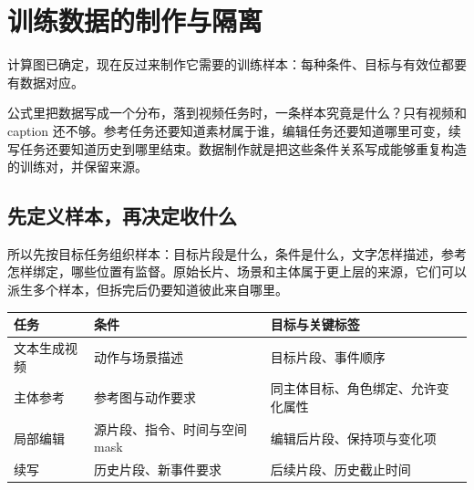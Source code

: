 \chapter{训练数据的制作与隔离}\label{seedance-m11}

计算图已确定，现在反过来制作它需要的训练样本：每种条件、目标与有效位都要有数据对应。

公式里把数据写成一个分布，落到视频任务时，一条样本究竟是什么？只有视频和 caption 还不够。参考任务还要知道素材属于谁，编辑任务还要知道哪里可变，续写任务还要知道历史到哪里结束。数据制作就是把这些条件关系写成能够重复构造的训练对，并保留来源。

\section{先定义样本，再决定收什么}\label{seedance-m11-ux5148ux5b9aux4e49ux6837ux672cux518dux51b3ux5b9aux6536ux4ec0ux4e48}

所以先按目标任务组织样本：目标片段是什么，条件是什么，文字怎样描述，参考怎样绑定，哪些位置有监督。原始长片、场景和主体属于更上层的来源，它们可以派生多个样本，但拆完后仍要知道彼此来自哪里。

{\def\LTcaptype{table} %
\small\setlength{\tabcolsep}{3pt}\renewcommand{\arraystretch}{1.18}
\begin{longtable}[]{@{}
  >{\raggedright\arraybackslash}p{}
  >{\raggedright\arraybackslash}p{}
  >{\raggedright\arraybackslash}p{}@{}}
\toprule\noalign{}
\begin{minipage}[b]{\linewidth}\raggedright
任务
\end{minipage} & \begin{minipage}[b]{\linewidth}\raggedright
条件
\end{minipage} & \begin{minipage}[b]{\linewidth}\raggedright
目标与关键标签
\end{minipage} \\
\midrule\noalign{}
\endhead
\bottomrule\noalign{}
\endlastfoot
文本生成视频 & 动作与场景描述 & 目标片段、事件顺序 \\
主体参考 & 参考图与动作要求 & 同主体目标、角色绑定、允许变化属性 \\
局部编辑 & 源片段、指令、时间与空间 mask & 编辑后片段、保持项与变化项 \\
续写 & 历史片段、新事件要求 & 后续片段、历史截止时间 \\
\end{longtable}
}

